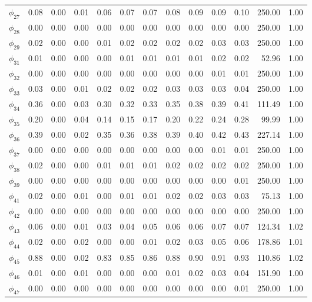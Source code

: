 \documentclass[]{article}
\begin{document}
\begin{table}[ht]
\begin{tabularx}{\textwidth}{lRRRRRRRRRRRR}
  $\phi_{27}$ & 0.08 & 0.00 & 0.01 & 0.06 & 0.07 & 0.07 & 0.08 & 0.09 & 0.09 & 0.10 & 250.00 & 1.00 \\ 
  $\phi_{28}$ & 0.00 & 0.00 & 0.00 & 0.00 & 0.00 & 0.00 & 0.00 & 0.00 & 0.00 & 0.00 & 250.00 & 1.00 \\ 
  $\phi_{29}$ & 0.02 & 0.00 & 0.00 & 0.01 & 0.02 & 0.02 & 0.02 & 0.02 & 0.03 & 0.03 & 250.00 & 1.00 \\ 
  $\phi_{31}$ & 0.01 & 0.00 & 0.00 & 0.00 & 0.01 & 0.01 & 0.01 & 0.01 & 0.02 & 0.02 & 52.96 & 1.00 \\ 
  $\phi_{32}$ & 0.00 & 0.00 & 0.00 & 0.00 & 0.00 & 0.00 & 0.00 & 0.00 & 0.01 & 0.01 & 250.00 & 1.00 \\ 
  $\phi_{33}$ & 0.03 & 0.00 & 0.01 & 0.02 & 0.02 & 0.02 & 0.03 & 0.03 & 0.03 & 0.04 & 250.00 & 1.00 \\ 
  $\phi_{34}$ & 0.36 & 0.00 & 0.03 & 0.30 & 0.32 & 0.33 & 0.35 & 0.38 & 0.39 & 0.41 & 111.49 & 1.00 \\ 
  $\phi_{35}$ & 0.20 & 0.00 & 0.04 & 0.14 & 0.15 & 0.17 & 0.20 & 0.22 & 0.24 & 0.28 & 99.99 & 1.00 \\ 
  $\phi_{36}$ & 0.39 & 0.00 & 0.02 & 0.35 & 0.36 & 0.38 & 0.39 & 0.40 & 0.42 & 0.43 & 227.14 & 1.00 \\ 
  $\phi_{37}$ & 0.00 & 0.00 & 0.00 & 0.00 & 0.00 & 0.00 & 0.00 & 0.00 & 0.01 & 0.01 & 250.00 & 1.00 \\ 
  $\phi_{38}$ & 0.02 & 0.00 & 0.00 & 0.01 & 0.01 & 0.01 & 0.02 & 0.02 & 0.02 & 0.02 & 250.00 & 1.00 \\ 
  $\phi_{39}$ & 0.00 & 0.00 & 0.00 & 0.00 & 0.00 & 0.00 & 0.00 & 0.00 & 0.00 & 0.01 & 250.00 & 1.00 \\ 
  $\phi_{41}$ & 0.02 & 0.00 & 0.01 & 0.00 & 0.01 & 0.01 & 0.02 & 0.02 & 0.03 & 0.03 & 75.13 & 1.00 \\ 
  $\phi_{42}$ & 0.00 & 0.00 & 0.00 & 0.00 & 0.00 & 0.00 & 0.00 & 0.00 & 0.00 & 0.00 & 250.00 & 1.00 \\ 
  $\phi_{43}$ & 0.06 & 0.00 & 0.01 & 0.03 & 0.04 & 0.05 & 0.06 & 0.06 & 0.07 & 0.07 & 124.34 & 1.02 \\ 
  $\phi_{44}$ & 0.02 & 0.00 & 0.02 & 0.00 & 0.00 & 0.01 & 0.02 & 0.03 & 0.05 & 0.06 & 178.86 & 1.01 \\ 
  $\phi_{45}$ & 0.88 & 0.00 & 0.02 & 0.83 & 0.85 & 0.86 & 0.88 & 0.90 & 0.91 & 0.93 & 110.86 & 1.02 \\ 
  $\phi_{46}$ & 0.01 & 0.00 & 0.01 & 0.00 & 0.00 & 0.00 & 0.01 & 0.02 & 0.03 & 0.04 & 151.90 & 1.00 \\ 
  $\phi_{47}$ & 0.00 & 0.00 & 0.00 & 0.00 & 0.00 & 0.00 & 0.00 & 0.00 & 0.00 & 0.01 & 250.00 & 1.00 \\ 

\end{tabularx}
\end{table}
\end{document}
